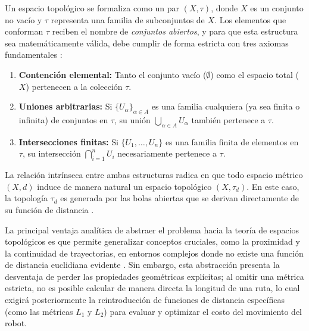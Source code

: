 \begin{definition}

Un espacio topológico se formaliza como un par $(X, \tau)$, donde $X$ es un 
conjunto no vacío y $\tau$ representa una familia de subconjuntos de $X$. Los elementos 
que conforman $\tau$ reciben el nombre de \textit{conjuntos abiertos}, y para que esta 
estructura sea matemáticamente válida, debe cumplir de forma estricta con tres axiomas 
fundamentales \parencite{antonyan2016topologia}:

\begin{enumerate}
    \item \textbf{Contención elemental:} Tanto el conjunto vacío ($\emptyset$) como el espacio 
    total ($X$) pertenecen a la colección $\tau$.
    \item \textbf{Uniones arbitrarias:} Si $\{U_\alpha\}_{\alpha \in A}$ es una familia 
    cualquiera (ya sea finita o infinita) de conjuntos en $\tau$, su 
    unión $\bigcup_{\alpha \in A} U_\alpha$ también pertenece a $\tau$.
    \item \textbf{Intersecciones finitas:} Si $\{U_1, \dots, U_n\}$ es una familia 
    finita de elementos en $\tau$, su intersección $\bigcap_{i=1}^n U_i$ necesariamente 
    pertenece a $\tau$.
\end{enumerate}
\end{definition}

La relación intrínseca entre ambas estructuras radica en que todo espacio métrico $(X, d)$ 
induce de manera natural un espacio topológico $(X, \tau_d)$. En este caso, la 
topología $\tau_d$ es generada por las bolas abiertas que se derivan directamente de su 
función de distancia \parencite{antonyan2016topologia}. 

La principal ventaja analítica de abstraer el problema hacia la teoría de espacios 
topológicos es que permite generalizar conceptos cruciales, como la proximidad 
y la continuidad de trayectorias, en entornos complejos donde no existe una 
función de distancia euclidiana evidente \parencite{waldmann2014topology}. Sin embargo, 
esta abstracción presenta la desventaja de perder las propiedades geométricas explícitas; 
al omitir una métrica estricta, no es posible calcular de manera directa la longitud de 
una ruta, lo cual exigirá posteriormente la reintroducción de funciones de 
distancia específicas (como las métricas $L_1$ y $L_2$) para evaluar y optimizar 
el costo del movimiento del robot.


